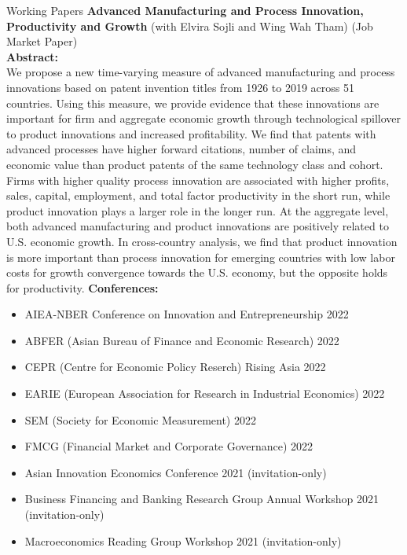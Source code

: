 \documentclass{resume} %
\begin{document}
\begin{rSection}{Working Papers}
	{\bf Advanced Manufacturing and Process Innovation, Productivity and Growth} (with Elvira Sojli and Wing Wah Tham) (Job Market Paper)\\
	{\bf Abstract:}\\
	We propose a new time-varying measure of advanced manufacturing and process innovations based on patent invention titles from 1926 to 2019 across 51 countries. Using this measure, we provide evidence that these innovations are important for firm and aggregate economic growth through technological spillover to product innovations and increased profitability. We find that patents with advanced processes have higher forward citations, number of claims, and economic value than product patents of the same technology class and cohort. Firms with higher quality process innovation are associated with higher profits, sales, capital, employment, and total factor productivity in the short run, while product innovation plays a larger role in the longer run. At the aggregate level, both advanced manufacturing and product innovations are positively related to U.S. economic growth. In cross-country analysis, we find that product innovation is more important than process innovation for emerging countries with low labor costs for growth convergence towards the U.S. economy, but the opposite holds for productivity.
		{\bf Conferences:}
	\begin{itemize}
    \item AIEA-NBER Conference on Innovation and Entrepreneurship 2022
		\item ABFER (Asian Bureau of Finance and Economic Research) 2022
		\item CEPR (Centre for Economic Policy Reserch) Rising Asia 2022
		\item EARIE (European Association for Research in Industrial Economics) 2022
		\item SEM (Society for Economic Measurement) 2022
		\item FMCG (Financial Market and Corporate Governance) 2022
		\item Asian Innovation Economics Conference 2021 (invitation-only)
		\item Business Financing and Banking Research Group Annual Workshop 2021 (invitation-only)
		\item Macroeconomics Reading Group Workshop 2021 (invitation-only)
	\end{itemize}


\end{rSection}
\end{document}
